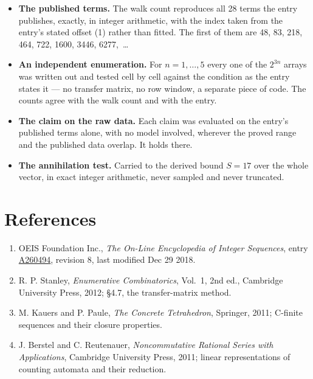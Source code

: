 \documentclass[11pt]{article}
\theoremstyle{definition}
\begin{document}
\begin{itemize}

\item {\bfseries The published terms.} The walk count reproduces all 28 terms the entry publishes, exactly, in integer arithmetic, with the index taken from the entry's stated offset (1) rather than fitted. The first of them are 48, 83, 218, 464, 722, 1600, 3446, 6277,~\dots

\item {\bfseries An independent enumeration.} For $n = 1,\dots,5$ every one of the $2^{3n}$ arrays was written out and tested cell by cell against the condition as the entry states it --- no transfer matrix, no row window, a separate piece of code. The counts agree with the walk count and with the entry.

\item {\bfseries The claim on the raw data.} Each claim was evaluated on the entry's published terms alone, with no model involved, wherever the proved range and the published data overlap. It holds there.

\item {\bfseries The annihilation test.} Carried to the derived bound $S = 17$ over the whole vector, in exact integer arithmetic, never sampled and never truncated.

\end{itemize}

\section{References}

\begin{enumerate}

\item OEIS Foundation Inc., \emph{The On-Line Encyclopedia of Integer Sequences}, entry \href{https://oeis.org/A260494}{A260494}, revision 8, last modified Dec 29 2018.

\item R. P. Stanley, \emph{Enumerative Combinatorics}, Vol.~1, 2nd ed., Cambridge University Press, 2012; \S4.7, the transfer-matrix method.

\item M. Kauers and P. Paule, \emph{The Concrete Tetrahedron}, Springer, 2011; C-finite sequences and their closure properties.

\item J. Berstel and C. Reutenauer, \emph{Noncommutative Rational Series with Applications}, Cambridge University Press, 2011; linear representations of counting automata and their reduction.

\end{enumerate}
\end{document}
